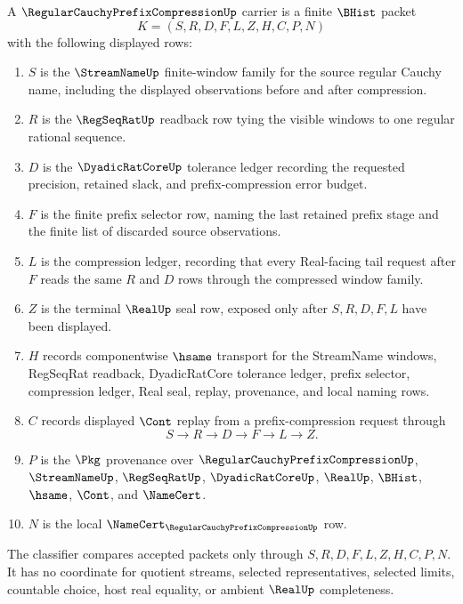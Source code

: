\begin{definition}
\label{def:regular-cauchy-prefix-compression-carrier}
A $\RegularCauchyPrefixCompressionUp$ carrier is a finite $\BHist$ packet
$$
K=(S,R,D,F,L,Z,H,C,P,N)
$$
with the following displayed rows:
\begin{enumerate}
\item $S$ is the $\StreamNameUp$ finite-window family for the source regular Cauchy name, including the displayed observations before and after compression.
\item $R$ is the $\RegSeqRatUp$ readback row tying the visible windows to one regular rational sequence.
\item $D$ is the $\DyadicRatCoreUp$ tolerance ledger recording the requested precision, retained slack, and prefix-compression error budget.
\item $F$ is the finite prefix selector row, naming the last retained prefix stage and the finite list of discarded source observations.
\item $L$ is the compression ledger, recording that every Real-facing tail request after $F$ reads the same $R$ and $D$ rows through the compressed window family.
\item $Z$ is the terminal $\RealUp$ seal row, exposed only after $S,R,D,F,L$ have been displayed.
\item $H$ records componentwise $\hsame$ transport for the StreamName windows, RegSeqRat readback, DyadicRatCore tolerance ledger, prefix selector, compression ledger, Real seal, replay, provenance, and local naming rows.
\item $C$ records displayed $\Cont$ replay from a prefix-compression request through
$$
S\longrightarrow R\longrightarrow D\longrightarrow F\longrightarrow L\longrightarrow Z .
$$
\item $P$ is the $\Pkg$ provenance over $\RegularCauchyPrefixCompressionUp$, $\StreamNameUp$, $\RegSeqRatUp$, $\DyadicRatCoreUp$, $\RealUp$, $\BHist$, $\hsame$, $\Cont$, and $\NameCert$.
\item $N$ is the local $\NameCert_{\RegularCauchyPrefixCompressionUp}$ row.
\end{enumerate}
The classifier compares accepted packets only through $S,R,D,F,L,Z,H,C,P,N$. It has no coordinate for quotient streams, selected representatives, selected limits, countable choice, host real equality, or ambient $\RealUp$ completeness.
\end{definition}

